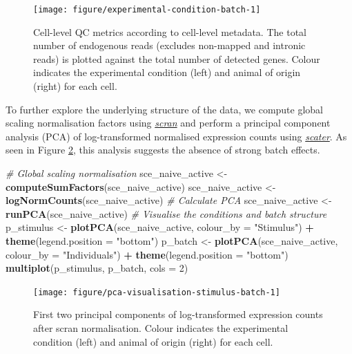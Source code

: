 \documentclass[9pt,a4paper,]{extarticle}
\newenvironment{Shaded}{\begin{snugshade}}{\end{snugshade}}
\newcommand{\CommentTok}[1]{\textcolor[rgb]{0.56,0.35,0.01}{\textit{#1}}}
\newcommand{\DataTypeTok}[1]{\textcolor[rgb]{0.13,0.29,0.53}{#1}}
\newcommand{\DecValTok}[1]{\textcolor[rgb]{0.00,0.00,0.81}{#1}}
\newcommand{\KeywordTok}[1]{\textcolor[rgb]{0.13,0.29,0.53}{\textbf{#1}}}
\newcommand{\NormalTok}[1]{#1}
\newcommand{\OperatorTok}[1]{\textcolor[rgb]{0.81,0.36,0.00}{\textbf{#1}}}
\newcommand{\StringTok}[1]{\textcolor[rgb]{0.31,0.60,0.02}{#1}}
\begin{document}
\begin{figure}

{\centering \texttt{[image: figure/experimental-condition-batch-1]} 

}

\caption{Cell-level QC metrics according to cell-level metadata. The total number of endogenous reads (excludes non-mapped and intronic reads) is plotted against the total number of detected genes. Colour indicates the experimental condition (left) and animal of origin (right) for each cell.}\label{fig:experimental-condition-batch}
\end{figure}

To further explore the underlying structure of the data, we compute global
scaling normalisation factors using \emph{\href{https://bioconductor.org/packages/3.11/scran}{scran}} and perform a
principal component analysis (PCA) of log-transformed normalised expression
counts using \emph{\href{https://bioconductor.org/packages/3.11/scater}{scater}}.
As seen in Figure \ref{fig:pca-visualisation-stimulus-batch}, this analysis
suggests the absence of strong batch effects.

\begin{Shaded}
\begin{Highlighting}[]
\CommentTok{# Global scaling normalisation}
\NormalTok{sce_naive_active <-}\StringTok{ }\KeywordTok{computeSumFactors}\NormalTok{(sce_naive_active)}
\NormalTok{sce_naive_active <-}\StringTok{ }\KeywordTok{logNormCounts}\NormalTok{(sce_naive_active)}
\CommentTok{# Calculate PCA}
\NormalTok{sce_naive_active <-}\StringTok{ }\KeywordTok{runPCA}\NormalTok{(sce_naive_active)}
\CommentTok{# Visualise the conditions and batch structure}
\NormalTok{p_stimulus <-}\StringTok{ }\KeywordTok{plotPCA}\NormalTok{(sce_naive_active, }\DataTypeTok{colour_by =} \StringTok{"Stimulus"}\NormalTok{) }\OperatorTok{+}
\StringTok{  }\KeywordTok{theme}\NormalTok{(}\DataTypeTok{legend.position =} \StringTok{"bottom"}\NormalTok{)}
\NormalTok{p_batch <-}\StringTok{ }\KeywordTok{plotPCA}\NormalTok{(sce_naive_active, }\DataTypeTok{colour_by =} \StringTok{"Individuals"}\NormalTok{) }\OperatorTok{+}
\StringTok{  }\KeywordTok{theme}\NormalTok{(}\DataTypeTok{legend.position =} \StringTok{"bottom"}\NormalTok{)}
\KeywordTok{multiplot}\NormalTok{(p_stimulus, p_batch, }\DataTypeTok{cols =} \DecValTok{2}\NormalTok{)}
\end{Highlighting}
\end{Shaded}

\begin{figure}

{\centering \texttt{[image: figure/pca-visualisation-stimulus-batch-1]} 

}

\caption{First two principal components of log-transformed expression counts after scran normalisation. Colour indicates the experimental condition (left) and animal of origin (right) for each cell.}\label{fig:pca-visualisation-stimulus-batch}
\end{figure}
\end{document}
